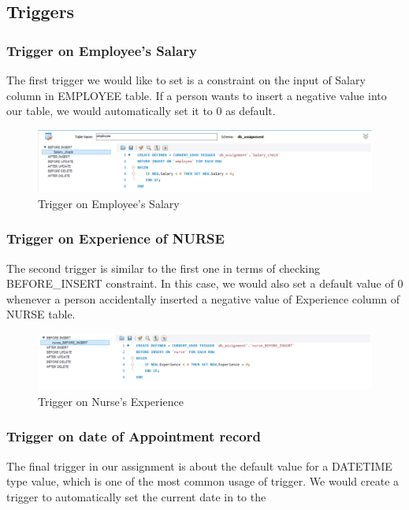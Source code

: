 \subsection{Triggers}

\subsubsection{Trigger on Employee's Salary}
The first trigger we would like to set is a constraint on the input of Salary column in EMPLOYEE table. If a person wants to insert a negative value into our table, we would automatically set it to 0 as default.

\begin{figure}[H]
    \centering
    \includegraphics[width = 12cm]{assets/trigger_1.png}
    \captionsetup{justification=centering,margin=2cm}
    \caption{Trigger on Employee's Salary}
\end{figure}

\subsubsection{Trigger on Experience of NURSE}
The second trigger is similar to the first one in terms of checking BEFORE\_INSERT constraint. In this case, we would also set a default value of 0 whenever a person accidentally inserted a negative value of Experience column of NURSE table.

\begin{figure}[H]
    \centering
    \includegraphics[width = 12cm]{assets/trigger_2.png}
    \captionsetup{justification=centering,margin=2cm}
    \caption{Trigger on Nurse's Experience}
\end{figure}

\subsubsection{Trigger on date of Appointment record}

The final trigger in our assignment is about the default value for a DATETIME type value, which is one of the most common usage of trigger. We would create a trigger to automatically set the current date in to the 

